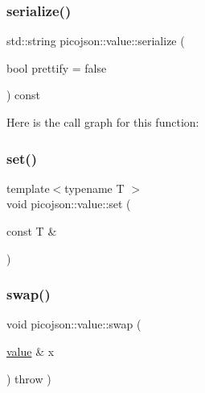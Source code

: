 \hypertarget{classpicojson_1_1value_ad5fa91c040826e85855678db9258238d}{}\label{classpicojson_1_1value_ad5fa91c040826e85855678db9258238d} 
\subsubsection{\texorpdfstring{serialize()}{serialize()}\hspace{0.1cm}{\footnotesize\ttfamily [2/2]}}
{\footnotesize\ttfamily std\+::string picojson\+::value\+::serialize (\begin{DoxyParamCaption}\item[{bool}]{prettify = {\ttfamily false} }\end{DoxyParamCaption}) const\hspace{0.3cm}{\ttfamily [inline]}}

Here is the call graph for this function\+:
\hypertarget{classpicojson_1_1value_a5349fff183e52146f2835d7fa0a10358}{}\label{classpicojson_1_1value_a5349fff183e52146f2835d7fa0a10358} 
\subsubsection{\texorpdfstring{set()}{set()}}
{\footnotesize\ttfamily template$<$typename T $>$ \\
void picojson\+::value\+::set (\begin{DoxyParamCaption}\item[{const T \&}]{ }\end{DoxyParamCaption})}

\hypertarget{classpicojson_1_1value_a6e3ac589ed811603ef9dadc6f91c737d}{}\label{classpicojson_1_1value_a6e3ac589ed811603ef9dadc6f91c737d} 
\subsubsection{\texorpdfstring{swap()}{swap()}}
{\footnotesize\ttfamily void picojson\+::value\+::swap (\begin{DoxyParamCaption}\item[{\hyperlink{classpicojson_1_1value}{value} \&}]{x }\end{DoxyParamCaption}) throw  ) \hspace{0.3cm}{\ttfamily [inline]}}

